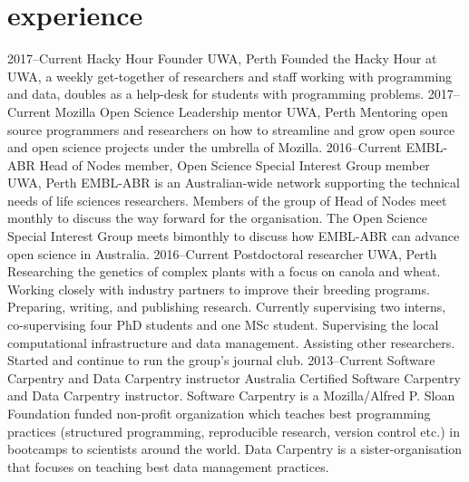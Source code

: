 \documentclass[]{friggeri-cv} %
\begin{document}

\section{experience}

\begin{entrylist}

\entry
{2017--Current}
{Hacky Hour Founder}
{UWA, Perth}
{Founded the Hacky Hour at UWA, a weekly get-together of researchers and staff working with programming and data, doubles as a help-desk for students with programming problems.}
\entry
{2017--Current}
{Mozilla Open Science Leadership mentor}
{UWA, Perth}
{Mentoring open source programmers and researchers on how to streamline and grow open source and open science projects under the umbrella of Mozilla.}
\entry
{2016--Current}
{EMBL-ABR Head of Nodes member, Open Science Special Interest Group member}
{UWA, Perth}
{EMBL-ABR is an Australian-wide network supporting the technical needs of life sciences researchers. Members of the group of Head of Nodes meet monthly to discuss the way forward for the organisation. The Open Science Special Interest Group meets bimonthly to discuss how EMBL-ABR can advance open science in Australia.}
\entry
{2016--Current}
{Postdoctoral researcher}
{UWA, Perth}
{Researching the genetics of complex plants with a focus on canola and wheat. Working closely with industry partners to improve their breeding programs. Preparing, writing, and publishing research. Currently supervising two interns, co-supervising four PhD students and one MSc student. Supervising the local computational infrastructure and data management. Assisting other researchers. Started and continue to run the group's journal club.}
\entry
{2013--Current}
{Software Carpentry and Data Carpentry instructor}
{Australia}
{Certified Software Carpentry and Data Carpentry instructor. Software Carpentry is a Mozilla/Alfred P. Sloan Foundation funded non-profit organization which teaches best programming practices (structured programming, reproducible research, version control etc.) in bootcamps to scientists around the world. Data Carpentry is a sister-organisation that focuses on teaching best data management practices.}
\end{entrylist}
\end{document}
